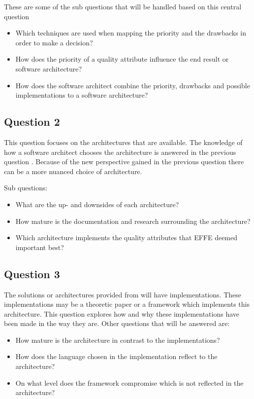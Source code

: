 These are some of the sub questions that will be handled based on this central question
\begin{itemize}
	\item Which techniques are used when mapping the priority and the drawbacks in order to make a decision?
	\item How does the priority of a quality attribute influence the end result or software architecture?
	\item How does the software architect combine the priority, drawbacks and possible implementations to a software architecture?
\end{itemize}

\subsection{Question 2}
\label{sec:Question2}

This question focuses on the architectures that are available. The knowledge of how a software architect chooses the architecture is answered in the previous question . Because of the new perspective gained in the previous question there can be a more nuanced choice of architecture.

Sub questions:
\begin{itemize}
	\item What are the up- and downsides of each architecture?
	\item How mature is the documentation and research surrounding the architecture?
	\item Which architecture implements the quality attributes that EFFE deemed important best?
\end{itemize}

\subsection{Question 3}

The solutions or architectures provided from  will have implementations. These implementations may be a theoretic paper or a framework which implements this architecture. This question explores how and why these implementations have been made in the way they are. Other questions that will be answered are:
\begin{itemize}
	\item How mature is the architecture in contrast to the implementations?
	\item How does the language chosen in the implementation reflect to the architecture?
	\item On what level does the framework compromise which is not reflected in the architecture?
\end{itemize}

